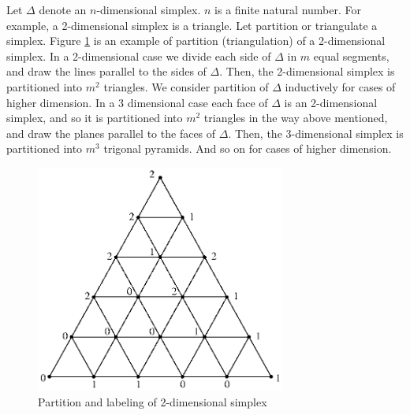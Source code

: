 \documentclass[reqno]{amsart}
\begin{document}
Let $\Delta$ denote an $n$-dimensional simplex. $n$ is a finite natural number. For example, a 2-dimensional simplex is a triangle.  Let partition or triangulate a simplex. Figure \ref{tria1} is an example of partition (triangulation) of a 2-dimensional simplex. In a 2-dimensional case we divide each side of $\Delta$ in $m$ equal segments, and draw the lines parallel to the sides of $\Delta$. Then, the 2-dimensional simplex is partitioned into $m^2$ triangles. We consider partition of $\Delta$ inductively for cases of higher dimension. In a 3 dimensional case each face of $\Delta$ is an 2-dimensional simplex, and so it is partitioned into $m^2$ triangles in the way above mentioned, and draw the planes parallel to the faces of $\Delta$. Then, the 3-dimensional simplex is partitioned into $m^3$ trigonal pyramids. And so on for cases of higher dimension.

\begin{figure}[ptb]
\begin{center}
\includegraphics[height=7.5cm]{br-non2.eps}
\end{center}
	\vspace*{-.3cm}
	\caption{Partition and labeling of 2-dimensional simplex}
	\label{tria1}
\end{figure}
\end{document}
